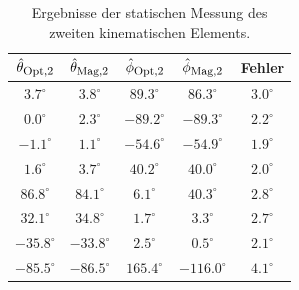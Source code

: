   \begin{table}[h]
    \centering
    \begin{tabular}{|c| c| c| c| c|} 
      \hline
      \rowcolor{gray}$\hat{\theta}_{\textrm{\footnotesize{\text{Opt},2}}}$ & $\hat{\theta}_{\textrm{\footnotesize{\text{Mag},2}}}$ & $\hat{\phi}_{\textrm{\footnotesize{\text{Opt},2}}}$ & $\hat{\phi}_{\textrm{\footnotesize{\text{Mag},2}}}$ & Fehler \\ 
     \hline
     $3.7^\circ$ & $3.8^\circ$ & $89.3^\circ$ & $86.3^\circ$ & $3.0^\circ$ \\ 
     \hline
     \rowcolor{lightgray}$0.0^\circ$ & $2.3^\circ$ & $-89.2^\circ$ & $-89.3^\circ$ & $2.2^\circ$ \\
     \hline
     $-1.1^\circ$ & $1.1^\circ$ & $-54.6^\circ$ & $-54.9^\circ$ & $1.9^\circ$ \\
     \hline
     \rowcolor{lightgray}$1.6^\circ$ & $3.7^\circ$  & $40.2^\circ$ & $40.0^\circ$ & $2.0^\circ$ \\
     \hline
     $86.8^\circ$ & $84.1^\circ$ & $6.1^\circ$ & $40.3^\circ$ & $2.8^\circ$ \\ 
     \hline
     \rowcolor{lightgray}$32.1^\circ$ & $34.8^\circ$ & $1.7^\circ$ & $3.3^\circ$ & $2.7^\circ$ \\ 
     \hline
     $-35.8^\circ$ & $-33.8^\circ$ & $2.5^\circ$ & $0.5^\circ$ & $2.1^\circ$ \\
     \hline
     \rowcolor{lightgray}$-85.5^\circ$ & $-86.5^\circ$ & $165.4^\circ$ & $-116.0^\circ$ & $4.1^\circ$ \\
     \hline
    \end{tabular}
    \caption{Ergebnisse der statischen Messung des zweiten kinematischen Elements.}
    \label{tab:Ergebnisse2}
  \end{table} 
  

